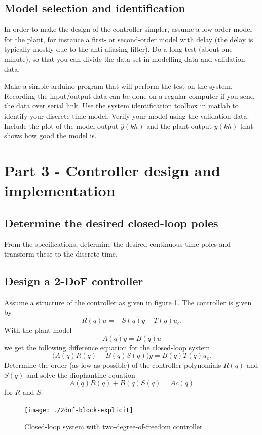 \documentclass[a4paper]{scrartcl}
\begin{document}
\subsection*{Model selection and identification}
\label{sec-4-2}
In order to make the design of the controller simpler, assume a low-order model for the plant, for instance a first- or second-order model with delay (the delay is typically mostly due to the anti-aliasing filter). Do a long test (about one minute), so that you can divide the data set in modelling data and validation data. 

Make a simple arduino program that will perform the test on the system. Recording the input/output data can be done on a regular computer if you send the data over serial link. Use the system identification toolbox in matlab to identify your discrete-time model. Verify your model using the validation data. Include the plot of the model-output \(\hat{y}(kh)\) and the plant output \(y(kh)\) that shows how good the model is.  

\section*{Part 3 - Controller design and implementation}
\label{sec-5}
\subsection*{Determine the desired closed-loop poles}
\label{sec-5-1}
From the specifications, determine the desired continuous-time poles and transform these to the discrete-time. 

\subsection*{Design a 2-DoF controller}
\label{sec-5-2}
Assume a structure of the controller as given in figure \ref{fig:2dof}. The controller is given by 
\[ R(q)u = -S(q)y + T(q)u_c. \]
With the plant-model
\[ A(q)y = B(q)u\]
we get the following difference equation for the closed-loop system
\[ \big( A(q)R(q) + B(q)S(q) \big) y = B(q)T(q) u_c. \]
Determine the order (as low as possible) of the controller polynomials $R(q)$ and $S(q)$ and solve the diophantine equation 
\[ A(q)R(q) + B(q)S(q)  = Ac(q) \]
for $R$ and $S$. 

\begin{figure}
\begin{center}
\texttt{[image: ./2dof-block-explicit]}
\caption{Closed-loop system with two-degree-of-freedom controller}
\label{fig:2dof}
\end{center}
\end{figure}
\end{document}
